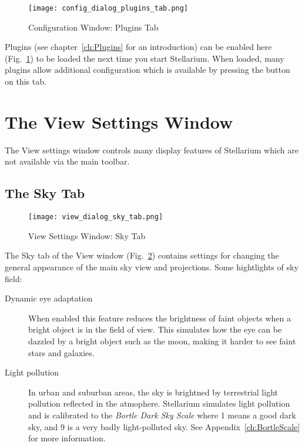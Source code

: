 \begin{figure}[htbp]
\centering\texttt{[image: config\_dialog\_plugins\_tab.png]}
\caption{Configuration Window: Plugins Tab}
\label{fig:gui:configuration:plugins}
\end{figure}


Plugins (see chapter~\ref{ch:Plugins} for an introduction) can be
enabled here (Fig.~\ref{fig:gui:configuration:plugins}) to be loaded the next time
you start Stellarium. When loaded, many plugins allow additional configuration
which is available by pressing the  button on this tab.


\section{The View Settings Window}
\label{sec:gui:view}

The View settings window controls many display features of Stellarium
which are not available via the main toolbar.

\subsection{The Sky Tab}
\label{sec:gui:view:sky}

\begin{figure}[htbp]
\centering\texttt{[image: view\_dialog\_sky\_tab.png]}
\caption{View Settings Window: Sky Tab}
\label{fig:gui:view:sky}
\end{figure}

The Sky tab of the View window (Fig.~\ref{fig:gui:view:sky}) contains settings
for changing the general appearance of the main sky view and projections. Some hightlights of sky field:
\begin{description}
\item[Dynamic eye adaptation] When enabled this feature reduces the
  brightness of faint objects when a bright object is in the field of
  view. This simulates how the eye can be dazzled by a bright object
  such as the moon, making it harder to see faint stars and galaxies.
\item[Light pollution] In urban and suburban areas, the sky is
  brightned by terrestrial light pollution reflected in the atmophere.
  Stellarium simulates light pollution and is calibrated to the
  \emph{Bortle Dark Sky Scale} where 1 means a good dark sky, and 9 is
  a very badly light-polluted sky. See Appendix~\ref{ch:BortleScale}
  for more information.
\end{description}

